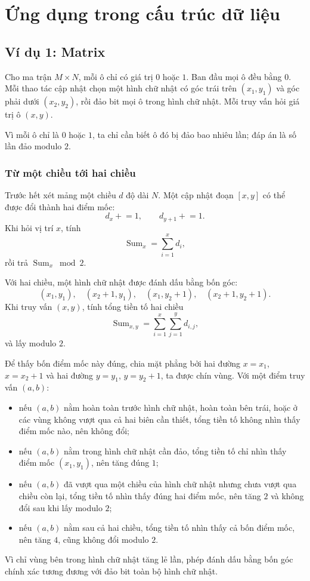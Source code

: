 \documentclass[11pt]{article}
\begin{document}
\tableofcontents

\section{Ứng dụng trong cấu trúc dữ liệu}

\subsection{Ví dụ 1: Matrix}

Cho ma trận \(M\times N\), mỗi ô chỉ có giá trị \(0\) hoặc \(1\). Ban đầu mọi
ô đều bằng \(0\). Mỗi thao tác cập nhật chọn một hình chữ nhật có góc trái
trên \((x_1,y_1)\) và góc phải dưới \((x_2,y_2)\), rồi đảo bit mọi ô trong
hình chữ nhật. Mỗi truy vấn hỏi giá trị ô \((x,y)\).

Vì mỗi ô chỉ là \(0\) hoặc \(1\), ta chỉ cần biết ô đó bị đảo bao nhiêu lần;
đáp án là số lần đảo modulo \(2\).

\subsubsection{Từ một chiều tới hai chiều}

Trước hết xét mảng một chiều \(d\) độ dài \(N\). Một cập nhật đoạn \([x,y]\)
có thể được đổi thành hai điểm mốc:
\[
  d_x \mathrel{+}=1,\qquad d_{y+1}\mathrel{+}=1.
\]
Khi hỏi vị trí \(x\), tính
\[
  \operatorname{Sum}_x=\sum_{i=1}^{x} d_i,
\]
rồi trả \(\operatorname{Sum}_x\bmod 2\).

Với hai chiều, một hình chữ nhật được đánh dấu bằng bốn góc:
\[
  (x_1,y_1),\quad (x_2+1,y_1),\quad
  (x_1,y_2+1),\quad (x_2+1,y_2+1).
\]
Khi truy vấn \((x,y)\), tính tổng tiền tố hai chiều
\[
  \operatorname{Sum}_{x,y}
  =\sum_{i=1}^{x}\sum_{j=1}^{y} d_{i,j},
\]
và lấy modulo \(2\).

Để thấy bốn điểm mốc này đúng, chia mặt phẳng bởi hai đường \(x=x_1\),
\(x=x_2+1\) và hai đường \(y=y_1\), \(y=y_2+1\), ta được chín vùng. Với một
điểm truy vấn \((a,b)\):
\begin{itemize}
  \item nếu \((a,b)\) nằm hoàn toàn trước hình chữ nhật, hoàn toàn bên trái,
  hoặc ở các vùng không vượt qua cả hai biên cần thiết, tổng tiền tố không
  nhìn thấy điểm mốc nào, nên không đổi;
  \item nếu \((a,b)\) nằm trong hình chữ nhật cần đảo, tổng tiền tố chỉ nhìn
  thấy điểm mốc \((x_1,y_1)\), nên tăng đúng \(1\);
  \item nếu \((a,b)\) đã vượt qua một chiều của hình chữ nhật nhưng chưa vượt
  qua chiều còn lại, tổng tiền tố nhìn thấy đúng hai điểm mốc, nên tăng \(2\)
  và không đổi sau khi lấy modulo \(2\);
  \item nếu \((a,b)\) nằm sau cả hai chiều, tổng tiền tố nhìn thấy cả bốn điểm
  mốc, nên tăng \(4\), cũng không đổi modulo \(2\).
\end{itemize}
Vì chỉ vùng bên trong hình chữ nhật tăng lẻ lần, phép đánh dấu bằng bốn góc
chính xác tương đương với đảo bit toàn bộ hình chữ nhật.
\end{document}
